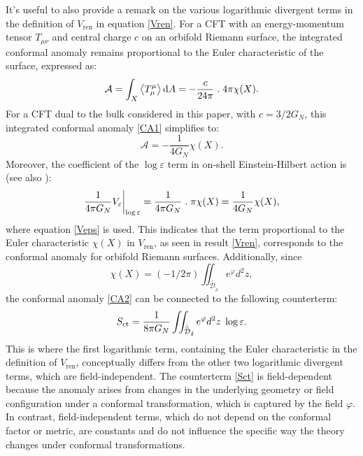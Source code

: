 \documentclass[a4paper,11pt]{article}
\newcommand{\dd}{\mathrm{d}}
\newcommand{\singfund}{\overset{{}_{\curlywedge}}{\mathcal{D}}}
\begin{document}
It's useful to also provide a remark on the various logarithmic divergent terms in the definition of $V_{\text{ren}}$ in equation \eqref{Vren}. For a CFT with an energy-momentum tensor $T_{\mu\nu}$ and central charge $c$ on an orbifold Riemann surface, the integrated conformal anomaly remains proportional to the Euler characteristic of the surface, expressed as:
\begin{equation}
\mathcal{A}=\int_{X} \left\langle T_{\mu}^{\mu}\right\rangle \dd A = -\frac{c}{24\pi}\hspace{1mm}.\hspace{1mm} 4\pi\chi(X).\label{CA1}
\end{equation}
For a CFT dual to the bulk considered in this paper, with $c = 3/2G_N$, this integrated conformal anomaly \eqref{CA1} simplifies to:
\begin{equation}
\mathcal{A} = -\frac{1}{4G_N} \chi(X).\label{CA2}
\end{equation}
Moreover, the coefficient of the $\log\varepsilon$ term in on-shell Einstein-Hilbert action is (see also \cite{henningson1998holographic, krasnov2000holography}):
\begin{equation}
\frac{1}{4\pi G_{N}} V_{\varepsilon}\bigg{|}_{\log{\varepsilon}}=\frac{1}{4\pi G_{N}}\hspace{1mm}.\hspace{1mm}\pi\chi(X)=\frac{1}{4G_N}\chi(X), 
\end{equation}
where equation \eqref{Veps} is used. This indicates that the term proportional to the Euler characteristic $\chi(X)$ in $V_{\text{ren}}$, as seen in result \eqref{Vren}, corresponds to the conformal anomaly for orbifold Riemann surfaces. Additionally, since
\begin{equation} 
\chi(X)=(-1/2\pi) \iint_{\singfund_{\tilde\delta}}  e^\varphi  d^2z,\nonumber
\end{equation}
the conformal anomaly \eqref{CA2} can be connected to the following counterterm:
\begin{equation}
S_{\text{ct}}= \frac{1}{8\pi G_N} \iint_{\singfund_{\tilde\delta}}  e^\varphi  d^2z\hspace{1mm} \log\varepsilon.\label{Sct}
\end{equation} 
This is where the first logarithmic term, containing the Euler characteristic in the definition of $V_{\text{ren}}$, conceptually differs from the other two logarithmic divergent terms, which are field-independent. The counterterm \eqref{Sct} is field-dependent because the anomaly arises from changes in the underlying geometry or field configuration under a conformal transformation, which is captured by the field $\varphi$. In contrast, field-independent terms, which do not depend on the conformal factor or metric, are constants and do not influence the specific way the theory changes under conformal transformations.
\end{document}
